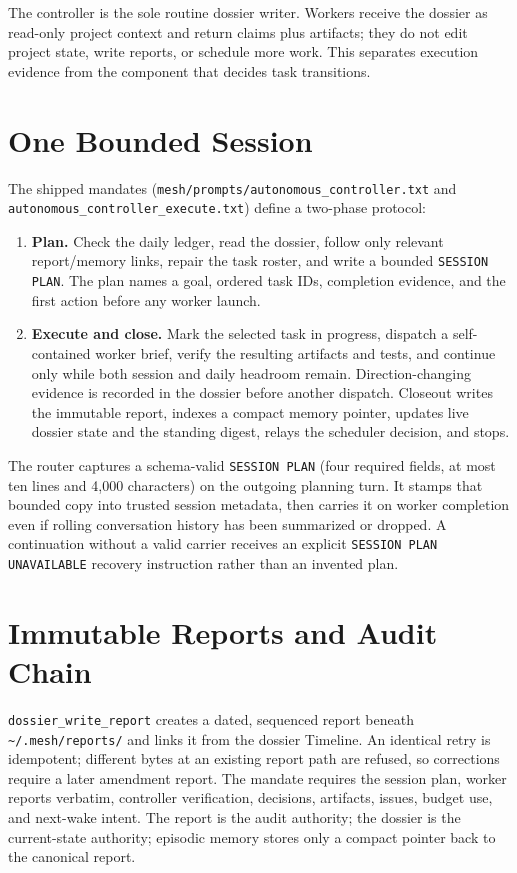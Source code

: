 \documentclass[11pt,letterpaper]{report}
\newcommand{\code}[1]{\texttt{#1}}
\begin{document}
The controller is the sole routine dossier writer. Workers receive the
dossier as read-only project context and return claims plus artifacts; they do
not edit project state, write reports, or schedule more work. This separates
execution evidence from the component that decides task transitions.

\section{One Bounded Session}

The shipped mandates
(\code{mesh/prompts/autonomous\_controller.txt} and
\code{autonomous\_controller\_execute.txt}) define a two-phase protocol:

\begin{enumerate}
  \item \textbf{Plan.} Check the daily ledger, read the dossier, follow only
        relevant report/memory links, repair the task roster, and write a
        bounded \code{SESSION PLAN}. The plan names a goal, ordered task IDs,
        completion evidence, and the first action before any worker launch.
  \item \textbf{Execute and close.} Mark the selected task in progress,
        dispatch a self-contained worker brief, verify the resulting artifacts
        and tests, and continue only while both session and daily headroom
        remain. Direction-changing evidence is recorded in the dossier before
        another dispatch. Closeout writes the immutable report, indexes a
        compact memory pointer, updates live dossier state and the standing
        digest, relays the scheduler decision, and stops.
\end{enumerate}

The router captures a schema-valid \code{SESSION PLAN} (four required fields,
at most ten lines and 4,000 characters) on the outgoing planning turn. It
stamps that bounded copy into trusted session metadata, then carries it on
worker completion even if rolling conversation history has been summarized or
dropped. A continuation without a valid carrier receives an explicit
\code{SESSION PLAN UNAVAILABLE} recovery instruction rather than an invented
plan.

\section{Immutable Reports and Audit Chain}

\code{dossier\_write\_report} creates a dated, sequenced report beneath
\code{\textasciitilde/.mesh/reports/} and links it from the dossier Timeline.
An identical retry is idempotent; different bytes at an existing report path
are refused, so corrections require a later amendment report. The mandate
requires the session plan, worker reports verbatim, controller verification,
decisions, artifacts, issues, budget use, and next-wake intent. The report is
the audit authority; the dossier is the current-state authority; episodic
memory stores only a compact pointer back to the canonical report.
\end{document}
